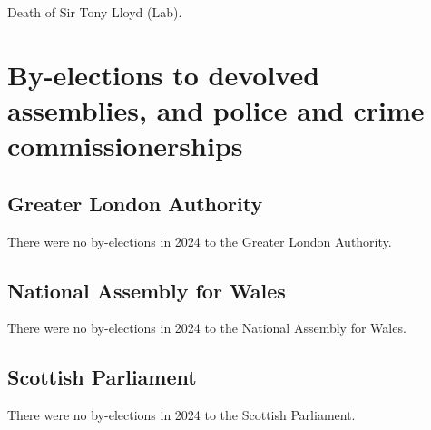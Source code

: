 \documentclass[a4paper,openany]{book}
\begin{document}

Death of Sir Tony Lloyd (Lab).

\chapter{By-elections to devolved assemblies, and police and crime commissionerships}

\section{Greater London Authority}

There were no by-elections in 2024 to the Greater London Authority.


\section{National Assembly for Wales}

There were no by-elections in 2024 to the National Assembly for Wales.


\section{Scottish Parliament}

There were no by-elections in 2024 to the Scottish Parliament.

%
%
%
\end{document}
